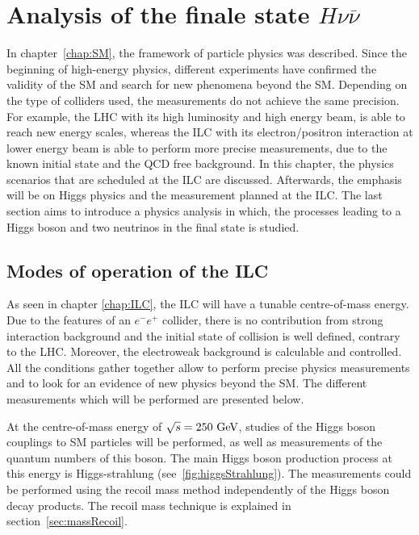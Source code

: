 \chapter{Analysis of the finale state $H\nu\overline{\nu}$}
\label{chap:phyics}

  In chapter~\ref{chap:SM}, the framework of particle physics was described. 
  Since the beginning of high-energy physics, different experiments have confirmed the validity of the \acrfull{SM} and search for new phenomena beyond the \gls{SM}.
  Depending on the type of colliders used, the measurements do not achieve the same precision. 
  For example, the \gls{LHC} with its high luminosity and high energy beam, is able to reach new energy scales, whereas the \gls{ILC} with its electron/positron interaction at lower energy beam is able to perform more precise measurements, due to the known initial state and the \gls{QCD} free background. 
  In this chapter, the physics scenarios that are scheduled at the \gls{ILC} are discussed. 
  Afterwards, the emphasis will be on Higgs physics and the measurement planned at the \gls{ILC}. 
  The last section aims to introduce a physics analysis in which, the processes leading to a Higgs boson and two neutrinos in the final state is studied.
 
 \minitoc

  \section{Modes of operation of the ILC}

  As seen in chapter \ref{chap:ILC}, the \gls{ILC} will have a tunable centre-of-mass energy.
  Due to the features of an $e^-e^+$ collider, there is no contribution from strong interaction background and the initial state of collision is well defined, contrary to the \gls{LHC}.
  Moreover, the electroweak background is calculable and controlled.
  All the conditions gather together allow to perform precise physics measurements and to look for an evidence of new physics beyond the \gls{SM}.
  The different measurements which will be performed are presented below.

  At the centre-of-mass energy of $\sqrt{s} = 250~\rm{GeV}$, studies of the Higgs boson couplings to \gls{SM} particles will be performed, as well as measurements of the quantum numbers of this boson.
  The main Higgs boson production process at this energy is Higgs-strahlung (see~\ref{fig:higgsStrahlung}).
  The measurements could be performed using the recoil mass method independently of the Higgs boson decay products.
  The recoil mass technique is explained in section~\ref{sec:massRecoil}.
 
